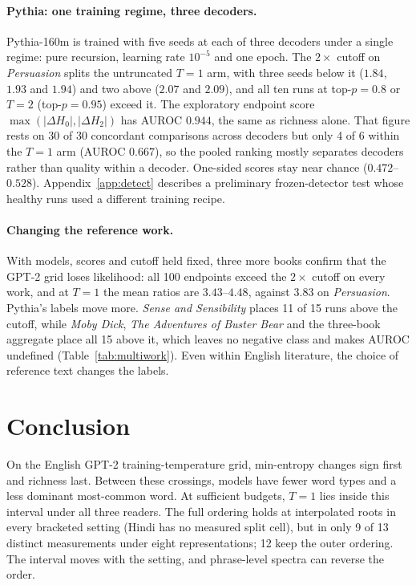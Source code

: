 \documentclass[10pt]{article}
\theoremstyle{plain}
\theoremstyle{definition}
\newcommand{\Htwo}{H_2}
\newcommand{\Hz}{H_0}
\begin{document}
\paragraph{Pythia: one training regime, three decoders.} Pythia-160m \citep{biderman2023pythia}
is trained with five seeds at each of three decoders under a single regime: pure recursion,
learning rate $10^{-5}$ and one epoch. The $2\times$ cutoff on \emph{Persuasion} splits the
untruncated $T=1$ arm, with three seeds below it ($1.84$, $1.93$ and $1.94$) and two above
($2.07$ and $2.09$), and all ten runs at top-$p=0.8$ or $T=2$ (top-$p=0.95$) exceed it. The
exploratory endpoint score
$\max(|\Delta\Hz|,|\Delta\Htwo|)$ has AUROC $0.944$, the same as richness alone. That figure
rests on 30 of 30 concordant comparisons across decoders but only 4 of 6 within the $T=1$ arm
(AUROC $0.667$), so the pooled ranking mostly separates decoders rather than quality within a
decoder. One-sided scores stay near chance ($0.472$--$0.528$). Appendix~\ref{app:detect}
describes a preliminary frozen-detector test whose healthy runs used a different training recipe.

\paragraph{Changing the reference work.} With models, scores and cutoff held fixed, three more
books confirm that the GPT-2 grid loses likelihood: all 100 endpoints exceed the $2\times$
cutoff on every work, and at $T=1$ the mean ratios are $3.43$--$4.48$, against $3.83$ on
\emph{Persuasion}. Pythia's labels move more. \emph{Sense and Sensibility} places 11 of 15 runs
above the cutoff, while \emph{Moby Dick}, \emph{The Adventures of Buster Bear} and the three-book
aggregate place all 15 above it, which leaves no negative class and makes AUROC undefined
(Table~\ref{tab:multiwork}). Even within English literature, the choice of reference text changes the labels.

\section{Conclusion}
\label{sec:conclusion}

On the English GPT-2 training-temperature grid, min-entropy changes sign first and richness
last. Between these crossings, models have fewer word types and a less dominant most-common
word. At sufficient budgets, $T=1$ lies inside this interval under all three readers. The full
ordering holds at interpolated roots in every bracketed setting (Hindi has no measured split
cell), but in only 9 of 13 distinct measurements under eight representations; 12 keep the outer
ordering. The interval moves with the setting, and phrase-level spectra can reverse the order.
\end{document}

